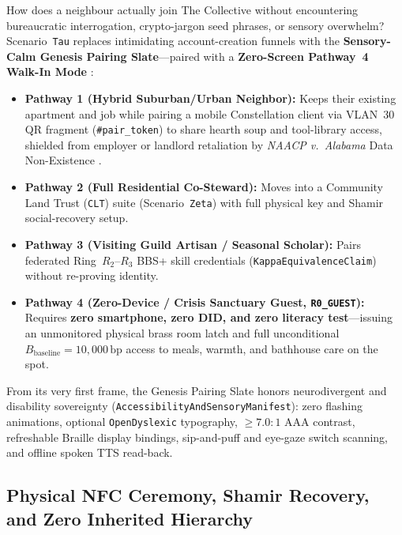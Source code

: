 How does a neighbour actually join The Collective without encountering bureaucratic interrogation, crypto-jargon seed phrases, or sensory overwhelm? Scenario~\texttt{Tau} replaces intimidating account-creation funnels with the \textbf{Sensory-Calm Genesis Pairing Slate}---paired with a \textbf{Zero-Screen Pathway~4 Walk-In Mode} \parencite{costanzachock2020design,w3c2023wcag}:
\begin{itemize}
    \item \textbf{Pathway 1 (Hybrid Suburban/Urban Neighbor):} Keeps their existing apartment and job while pairing a mobile Constellation client via VLAN~30 QR fragment (\texttt{\#pair\_token}) to share hearth soup and tool-library access, shielded from employer or landlord retaliation by \textit{NAACP v.\ Alabama} Data Non-Existence \parencite{naacp1958}.
    \item \textbf{Pathway 2 (Full Residential Co-Steward):} Moves into a Community Land Trust (\texttt{CLT}) suite (Scenario~\texttt{Zeta}) with full physical key and Shamir social-recovery setup.
    \item \textbf{Pathway 3 (Visiting Guild Artisan / Seasonal Scholar):} Pairs federated Ring~$R_2\text{--}R_3$ BBS+ skill credentials (\texttt{KappaEquivalenceClaim}) without re-proving identity.
    \item \textbf{Pathway 4 (Zero-Device / Crisis Sanctuary Guest, \texttt{R0\_GUEST}):} Requires \textbf{zero smartphone, zero DID, and zero literacy test}---issuing an unmonitored physical brass room latch and full unconditional $B_{\mathrm{baseline}} = 10{,}000\,\mathrm{bp}$ access to meals, warmth, and bathhouse care on the spot.
\end{itemize}

From its very first frame, the Genesis Pairing Slate honors neurodivergent and disability sovereignty (\texttt{AccessibilityAndSensoryManifest}): zero flashing animations, optional \texttt{OpenDyslexic} typography, $\ge 7.0:1$ AAA contrast, refreshable Braille display bindings, sip-and-puff and eye-gaze switch scanning, and offline spoken TTS read-back.

\subsection{Physical NFC Ceremony, Shamir Recovery, and Zero Inherited Hierarchy}

